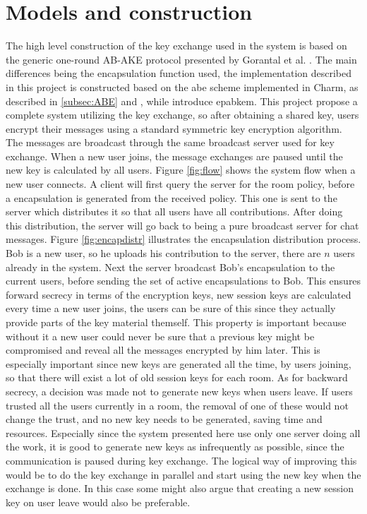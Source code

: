 \section{Models and construction}
The high level construction of the key exchange used in the system is based on the generic one-round AB-AKE protocol presented by Gorantal et al. \cite{gorantla2010attribute}. The main differences being the encapsulation function used, the implementation described in this project is constructed based on the \gls{abe} scheme implemented in Charm, as described in \ref{subsec:ABE} and \cite{abe_waters09}, while \cite{gorantla2010attribute} introduce \gls{epabkem}. This project propose a complete system utilizing the key exchange, so after obtaining a shared key, users encrypt their messages using a standard symmetric key encryption algorithm. The messages are broadcast through the same broadcast server used for key exchange. When a new user joins, the message exchanges are paused until the new key is calculated by all users. Figure \ref{fig:flow} shows the system flow when a new user connects. A client will first query the server for the room policy, before a encapsulation is generated from the received policy. This one is sent to the server which distributes it so that all users have all contributions. After doing this distribution, the server will go back to being a pure broadcast server for chat messages. Figure \ref{fig:encapdistr} illustrates the encapsulation distribution process. Bob is a new user, so he uploads his contribution to the server, there are $n$ users already in the system. Next the server broadcast Bob's encapsulation to the current users, before sending the set of active encapsulations to Bob. This ensures forward secrecy in terms of the encryption keys, new session keys are calculated every time a new user joins, the users can be sure of this since they actually provide parts of the key material themself. This property is important because without it a new user could never be sure that a previous key might be compromised and reveal all the messages encrypted by him later. This is especially important since new keys are generated all the time, by users joining, so that there will exist a lot of old session keys for each room. As for backward secrecy, a decision was made not to generate new keys when users leave. If users trusted all the users currently in a room, the removal of one of these would not change the trust, and no new key needs to be generated, saving time and resources. Especially since the system presented here use only one server doing all the work, it is good to generate new keys as infrequently as possible, since the communication is paused during key exchange. The logical way of improving this would be to do the key exchange in parallel and start using the new key when the exchange is done. In this case some might also argue that creating a new session key on user leave would also be preferable.



